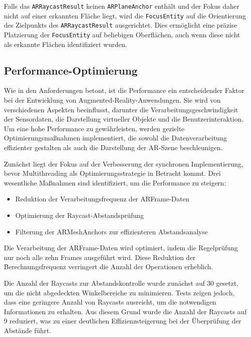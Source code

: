 Falls das \texttt{ARRaycastResult} keinen \texttt{ARPlaneAnchor} enthält und der Fokus daher nicht auf einer erkannten Fläche liegt, wird die \texttt{FocusEntity} auf die Orientierung des Zielpunkts des \texttt{ARRaycastResult} ausgerichtet. Dies ermöglicht eine präzise Platzierung der \texttt{FocusEntity} auf beliebigen Oberflächen, auch wenn diese nicht als erkannte Flächen identifiziert wurden.

\subsection{Performance-Optimierung}

Wie in den Anforderungen betont, ist die Performance ein entscheidender Faktor bei der Entwicklung von Augmented-Reality-Anwendungen. Sie wird von verschiedenen Aspekten beeinflusst, darunter die Verarbeitungsgeschwindigkeit der Sensordaten, die Darstellung virtueller Objekte und die Benutzerinteraktion. Um eine hohe Performance zu gewährleisten, werden gezielte Optimierungsmaßnahmen implementiert, die sowohl die Datenverarbeitung effizienter gestalten als auch die Darstellung der AR-Szene beschleunigen.

Zunächst liegt der Fokus auf der Verbesserung der synchronen Implementierung, bevor Multithreading als Optimierungsstrategie in Betracht kommt. Drei wesentliche Maßnahmen sind identifiziert, um die Performance zu steigern:

\begin{itemize}
\item Reduktion der Verarbeitungsfrequenz der ARFrame-Daten
\item Optimierung der Raycast-Abstandsprüfung
\item Filterung der ARMeshAnchors zur effizienteren Abstandsanalyse
\end{itemize}

Die Verarbeitung der ARFrame-Daten wird optimiert, indem die Regelprüfung nur noch alle zehn Frames ausgeführt wird. Diese Reduktion der Berechnungsfrequenz verringert die Anzahl der Operationen erheblich.

Die Anzahl der Raycasts zur Abstandskontrolle wurde zunächst auf 30 gesetzt, um die nicht abgedeckten Winkelbereiche zu minimieren. Tests zeigen jedoch, dass eine geringere Anzahl von Raycasts ausreicht, um die notwendigen Informationen zu erhalten. Aus diesem Grund wurde die Anzahl der Raycasts auf 9 reduziert, was zu einer deutlichen Effizienzsteigerung bei der Überprüfung der Abstände führt.

